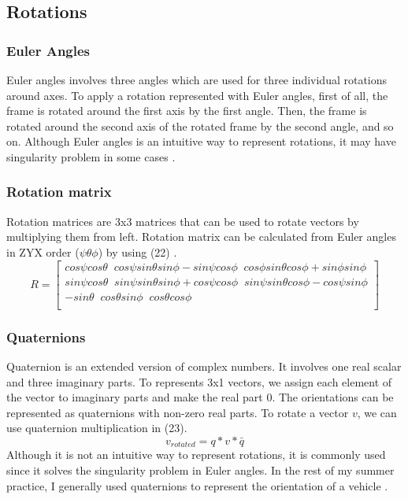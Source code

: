 \documentclass[12pt]{article}
\begin{document}
    \subsection{Rotations}

    \subsubsection{Euler Angles}
    Euler angles involves three angles which are used for three individual 
    rotations around axes. To apply a rotation represented with 
    Euler angles, first of all, the frame is rotated around the first axis 
    by the first angle. Then, the frame is rotated around the second axis 
    of the rotated frame by the second angle, and so on. Although Euler angles 
    is an intuitive way to represent rotations, it may have singularity problem 
    in some cases \cite{quat}.

    \subsubsection{Rotation matrix}
    Rotation matrices are 3x3 matrices that can be used to rotate vectors by 
    multiplying them from left. Rotation matrix can be calculated from Euler angles 
    in ZYX order (\(\psi\theta\phi\)) by using (22) \cite{quat}. %
    \begin{equation}\label{eq:22}
        R = \begin{bmatrix}
            cos\psi cos\theta\;\; cos\psi sin\theta sin\phi - sin\psi cos\phi\;\; cos\phi sin\theta cos\phi + sin\phi sin\phi\\
            sin\psi cos\theta\;\; sin\psi sin\theta sin\phi + cos\psi cos\phi\;\; sin\psi sin\theta cos\phi - cos\psi sin\phi\\   
            -sin\theta\;\; cos\theta sin\phi\;\; cos\theta cos\phi\\    
            
        \end{bmatrix}
    \end{equation} 

    \subsubsection{Quaternions}
    Quaternion is an extended version of complex numbers. It involves one real 
    scalar and three imaginary parts. To represents 3x1 vectors, we assign 
    each element of the vector to imaginary parts and make the real part 0. 
    The orientations can be represented as quaternions with non-zero real parts. 
    To rotate a vector \(v\), we can use quaternion multiplication in (23).
    \begin{equation}\label{eq:23}
        v_{rotated} = q*v*\bar{q}
    \end{equation}     
    Although it is not an intuitive way to represent rotations, 
    it is commonly used since it solves the singularity problem in Euler angles. 
    In the rest of my summer practice, I generally used quaternions to represent the 
    orientation of a vehicle \cite{quat}.
\end{document}
